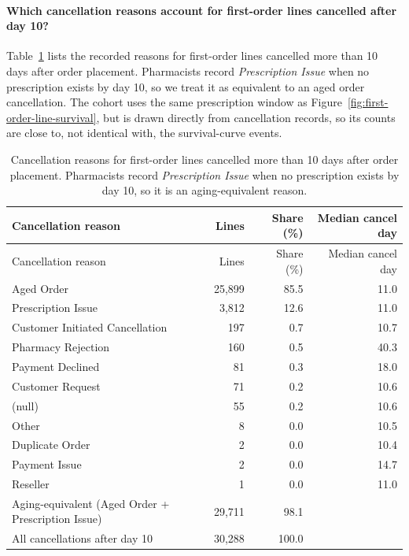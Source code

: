 \paragraph{Which cancellation reasons account for first-order lines cancelled after day 10?}
Table~\ref{tab:post-day-10-cancellation-reasons} lists the recorded
reasons for first-order lines cancelled more than 10 days after order
placement. Pharmacists record \emph{Prescription Issue} when no
prescription exists by day 10, so we treat it as equivalent to an aged
order cancellation. The cohort uses the same prescription window as
Figure~\ref{fig:first-order-line-survival}, but is drawn directly from
cancellation records, so its counts are close to, not identical with,
the survival-curve events.

\begin{longtable}{@{}lrrr@{}}
\caption{Cancellation reasons for first-order lines cancelled more than 10 days after order placement. Pharmacists record \emph{Prescription Issue} when no prescription exists by day 10, so it is an aging-equivalent reason.}
\label{tab:post-day-10-cancellation-reasons}\\
\toprule
Cancellation reason & Lines & Share (\%) & Median cancel day \\
\midrule
\endfirsthead
\toprule
Cancellation reason & Lines & Share (\%) & Median cancel day \\
\midrule
\endhead
Aged Order & 25,899 & 85.5 & 11.0 \\
Prescription Issue & 3,812 & 12.6 & 11.0 \\
Customer Initiated Cancellation & 197 & 0.7 & 10.7 \\
Pharmacy Rejection & 160 & 0.5 & 40.3 \\
Payment Declined & 81 & 0.3 & 18.0 \\
Customer Request & 71 & 0.2 & 10.6 \\
(null) & 55 & 0.2 & 10.6 \\
Other & 8 & 0.0 & 10.5 \\
Duplicate Order & 2 & 0.0 & 10.4 \\
Payment Issue & 2 & 0.0 & 14.7 \\
Reseller & 1 & 0.0 & 11.0 \\
\midrule
Aging-equivalent (Aged Order + Prescription Issue) & 29,711 & 98.1 &  \\
All cancellations after day 10 & 30,288 & 100.0 &  \\
\bottomrule
\end{longtable}

